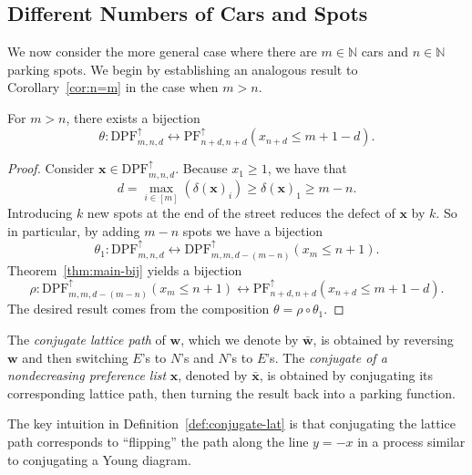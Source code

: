 \documentclass[11pt,reqno]{BICA}
\theoremstyle{definition}
\newcommand{\NDPF}{\mathrm{PF}^{\uparrow}}
\newcommand{\NDDPF}{\mathrm{DPF}^\uparrow}
\newcommand{\x}{\mathbf{x}}
\newcommand{\w}{\mathbf{w}}
\newcommand{\NN}{\mathbb{N}}
\newcommand{\bij}{\longleftrightarrow}
\begin{document}
\subsection{Different Numbers of Cars and Spots}
We now consider the more general case where there are $m\in\NN$ cars and  $n\in\NN$ parking spots.
We begin by establishing an analogous result to Corollary~\ref{cor:n=m} in the case when $m>n$.
\begin{proposition}\label{prop:m>n}
    For $m > n$, there exists a bijection 
    \[\theta:\NDDPF_{m,n,d} \bij \NDPF_{n+d,n+d}(x_{n+d} \leq m+1-d).\]
\end{proposition}
\begin{proof}
    Consider $\x \in \NDDPF_{m,n,d}$. Because $x_1 \geq 1$, we have that 
    \[d = \max_{i \in [m]}(\delta(\x)_i) \geq \delta(\x)_1 \geq m-n.\]
    Introducing $k$ new spots at the end of the street  reduces the defect of $\x$ by $k$. So in particular, by adding $m-n$ spots we have a bijection
    \[\theta_1:\NDDPF_{m,n,d} \bij \NDDPF_{m,m,d-(m-n)}(x_{m} \leq n+1).\]
    Theorem~\ref{thm:main-bij} yields a bijection
    \[\rho:\NDDPF_{m,m,d-(m-n)}(x_m \leq n+1) \bij \NDPF_{n+d,n+d}(x_{n+d} \leq m+1-d).\]
    The desired result comes from the composition $\theta=\rho \circ\theta_1$.
\end{proof}

\begin{definition}\label{def:conjugate-lat}
The \textit{conjugate lattice path} of $\w$, which we denote by $\bar{\w}$, is obtained by reversing $\w$ and then switching $E$'s to $N$'s and $N$'s to $E$'s. The \emph{conjugate of a nondecreasing  preference list} $\x$, denoted by $\bar{\x}$, is obtained by conjugating its corresponding lattice path, then turning the result back into a parking function.
\end{definition}

The key intuition in Definition~\ref{def:conjugate-lat} is that conjugating the lattice path corresponds to ``flipping'' the path along the line $y=-x$ in a process similar to conjugating a Young diagram.
\end{document}
